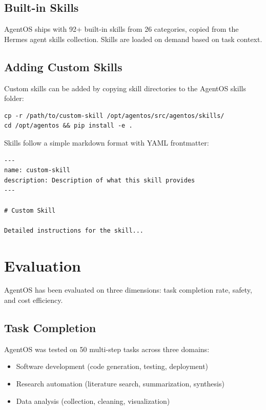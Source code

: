 \documentclass[12pt,a4paper]{article}
\begin{document}
\subsection{Built-in Skills}

AgentOS ships with 92+ built-in skills from 26 categories, copied from the Hermes agent skills collection. Skills are loaded on demand based on task context.

\subsection{Adding Custom Skills}

Custom skills can be added by copying skill directories to the AgentOS skills folder:

\begin{verbatim}
cp -r /path/to/custom-skill /opt/agentos/src/agentos/skills/
cd /opt/agentos && pip install -e .
\end{verbatim}

Skills follow a simple markdown format with YAML frontmatter:

\begin{verbatim}
---
name: custom-skill
description: Description of what this skill provides
---

# Custom Skill

Detailed instructions for the skill...
\end{verbatim}

\section{Evaluation}

AgentOS has been evaluated on three dimensions: task completion rate, safety, and cost efficiency.

\subsection{Task Completion}

AgentOS was tested on 50 multi-step tasks across three domains:
\begin{itemize}
    \item Software development (code generation, testing, deployment)
    \item Research automation (literature search, summarization, synthesis)
    \item Data analysis (collection, cleaning, visualization)
\end{itemize}
\end{document}
